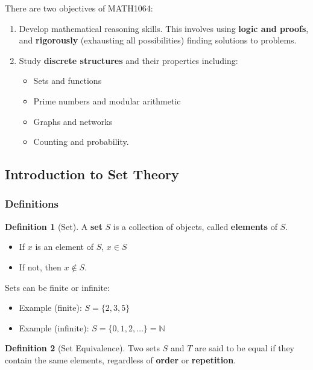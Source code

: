 \documentclass[12pt]{article}
\newcommand{\studyunit}{MATH1064}
\newcommand{\N}{\mathbb{N}}
\theoremstyle{definition}
\newtheorem{definition}{Definition}
\begin{document}
        There are two objectives of {\studyunit}:
        \begin{enumerate}
            \item Develop mathematical reasoning skills. This involves using \textbf{logic and proofs}, and 
            \textbf{rigorously} (exhausting all possibilities) finding solutions to problems.
            \item Study \textbf{discrete structures} and their properties including:
            \begin{itemize}
                \item Sets and functions
                \item Prime numbers and modular arithmetic
                \item Graphs and networks
                \item Counting and probability.
            \end{itemize}
        \end{enumerate}
    
        \subsection{Introduction to Set Theory}
        \subsubsection{Definitions}
        \begin{definition}[Set]
            \label{def:set}
            A \textbf{set} $S$ is a collection of objects, called \textbf{elements} of $S$.
        \end{definition}

        \begin{itemize}
                \item If $x$ is an element of $S$, $x \in S$
                \item If not, then $x \notin S$.
            \end{itemize}

        Sets can be finite or infinite:
        \begin{itemize}
            \item Example (finite): $S = \{2, 3, 5\}$
            \item Example (infinite): $S = \{0, 1, 2, \dots\} = \N$ \\
        \end{itemize}

        \begin{definition}[Set Equivalence]
            Two sets $S$ and $T$ are said to be equal if they contain the same elements, regardless of \textbf{order} or 
            \textbf{repetition}.
        \end{definition}
\end{document}
